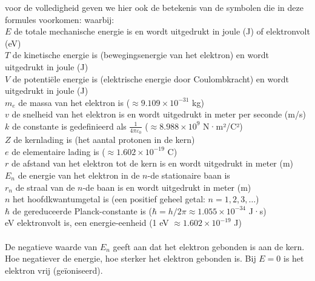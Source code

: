 \documentclass{report} %
\begin{document}
    voor de volledigheid geven we hier ook de betekenis van de symbolen die in deze formules voorkomen:
    waarbij:\\
    $E$ de totale mechanische energie is en wordt uitgedrukt in joule (J) of elektronvolt (eV)\\
    $T$ de kinetische energie is (bewegingsenergie van het elektron) en wordt uitgedrukt in joule (J)\\
    $V$ de potentiële energie is (elektrische energie door Coulombkracht) en wordt uitgedrukt in joule (J)\\
    $m_e$ de massa van het elektron is ($\approx 9.109 \times 10^{-31}$ kg)\\
    $v$ de snelheid van het elektron is en wordt uitgedrukt in meter per seconde (m/s)\\
    $k$ de constante is gedefinieerd als $\frac{1}{4\pi\varepsilon_0}$ ($\approx 8.988 \times 10^9$ N·m²/C²)\\
    $Z$ de kernlading is (het aantal protonen in de kern)\\
    $e$ de elementaire lading is ($\approx 1.602 \times 10^{-19}$ C)\\
    $r$ de afstand van het elektron tot de kern is en wordt uitgedrukt in meter (m)\\
    $E_n$ de energie van het elektron in de $n$-de stationaire baan is\\
    $r_n$ de straal van de $n$-de baan is en wordt uitgedrukt in meter (m)\\
    $n$ het hoofdkwantumgetal is (een positief geheel getal: $n = 1, 2, 3, \ldots$)\\
    $\hbar$ de gereduceerde Planck-constante is ($\hbar = h/2\pi \approx 1.055 \times 10^{-34}$ J·s)\\
    eV elektronvolt is, een energie-eenheid (1 eV $\approx 1.602 \times 10^{-19}$ J)\\
    \\
    De negatieve waarde van $E_n$ geeft aan dat het elektron gebonden is aan de kern. Hoe negatiever de energie, hoe sterker het elektron gebonden is. Bij $E = 0$ is het elektron vrij (geïoniseerd).
\end{document}
